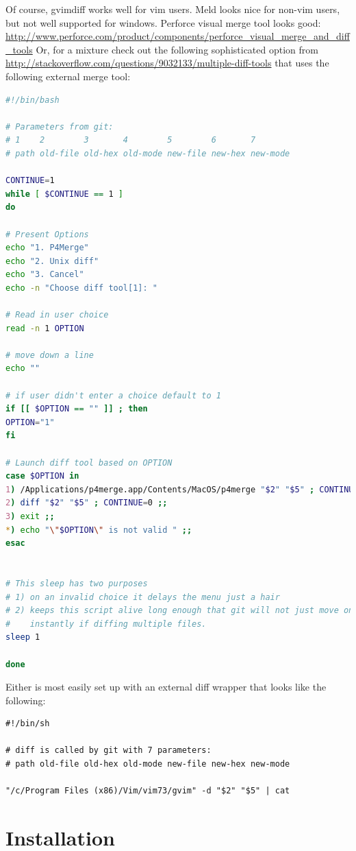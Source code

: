 Of course, gvimdiff works well for vim users.
Meld looks nice for non-vim users, but not well supported for windows.
Perforce visual merge tool looks good:
\url{http://www.perforce.com/product/components/perforce_visual_merge_and_diff_tools}
Or, for a mixture check out the following sophisticated option from
\url{http://stackoverflow.com/questions/9032133/multiple-diff-tools}
that uses the following external merge tool:
\begin{lstlisting}[mathescape=false,language=bash]
#!/bin/bash

# Parameters from git:
# 1    2        3       4        5        6       7
# path old-file old-hex old-mode new-file new-hex new-mode

CONTINUE=1
while [ $CONTINUE == 1 ]
do

# Present Options
echo "1. P4Merge"
echo "2. Unix diff"
echo "3. Cancel"
echo -n "Choose diff tool[1]: "

# Read in user choice
read -n 1 OPTION

# move down a line
echo ""

# if user didn't enter a choice default to 1
if [[ $OPTION == "" ]] ; then
OPTION="1"
fi

# Launch diff tool based on OPTION
case $OPTION in
1) /Applications/p4merge.app/Contents/MacOS/p4merge "$2" "$5" ; CONTINUE=0 ;;
2) diff "$2" "$5" ; CONTINUE=0 ;;
3) exit ;;
*) echo "\"$OPTION\" is not valid " ;;
esac


# This sleep has two purposes
# 1) on an invalid choice it delays the menu just a hair
# 2) keeps this script alive long enough that git will not just move onto the next file
#    instantly if diffing multiple files.
sleep 1

done
\end{lstlisting}

Either is most easily set up with an external diff
    wrapper that looks like the following:
\begin{verbatim}
#!/bin/sh

# diff is called by git with 7 parameters:
# path old-file old-hex old-mode new-file new-hex new-mode

"/c/Program Files (x86)/Vim/vim73/gvim" -d "$2" "$5" | cat
\end{verbatim}
\section{Installation}
